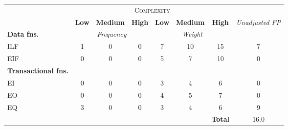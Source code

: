 
\begin{tabular}{|l|c|c|c|c|c|c|c|}
\cline{2-7}
\multicolumn{1}{c}{} & \multicolumn{6}{|c|}{\textsc{Complexity}} & \multicolumn{1}{c}{}  \\ \cline{2-8}
\multicolumn{1}{c|}{} & \textbf{Low} & \textbf{Medium} & \textbf{High} & \textbf{Low} & \textbf{Medium} & \textbf{High} & \multirow{2}{*}{\textit{Unadjusted FP}} \\ \cline{1-7}
\textbf{Data fns.} & \multicolumn{3}{|c|}{\textit{Frequency}} &  \multicolumn{3}{|c|}{\textit{Weight}} & \\ \hline
ILF 	& 1 & 0 & 0 & 7 & 10 & 15 & 7 	\\ \hline
EIF 	& 0 & 0 & 0 & 5 & 7 & 10 & 0		\\ \hline
\textbf{Transactional fns.} & \multicolumn{7}{|c|}{} \\ \hline
EI 		& 0 & 0 & 0 & 3 & 4 & 6 & 0 		\\ \hline
EO 		& 0 & 0 & 0 & 4 & 5 & 7 & 0		\\ \hline
EQ		& 3 & 0 & 0 & 3 & 4 & 6 & 9		\\ \hline
\multicolumn{6}{c|}{} & \textbf{Total} & 16.0 \\ \cline{7-8}
\end{tabular}
